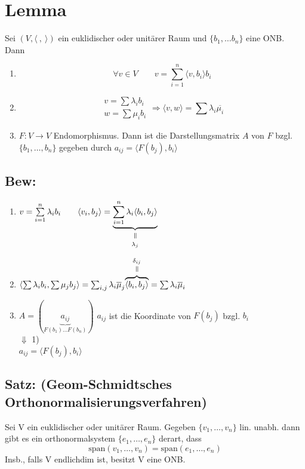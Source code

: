 \documentclass[titlepage,12pt,a4paper,ngerman]{report}
\newcommand{\verteq}{\rotatebox{90}{$\,=$}}
\newcommand{\equalto}[2]{\underset{\scriptstyle\overset{\mkern4mu\verteq}{#2}}{#1}}
\newcommand{\equaltoup}[2]{\overset{\scriptstyle\underset{\mkern4mu\verteq}{#2}}{#1}}
\newcommand{\tx}[1]{\textrm{#1}}
\newcommand{\ub}[1]{\underbrace{#1}}
\newcommand{\spa}{\tx{span}}
\newcommand{\summ}[2]{\sum_{#1}^{#2}}
\begin{document}
\section{Lemma} Sei $(V, \langle\ ,\ \rangle)$ ein euklidischer oder unitärer Raum und $\{b_1, \dots b_n \}$ eine ONB. Dann
\begin{enumerate}
	\item $$\forall v \in V \qquad v = \summ{i=1}{n} \langle v,b_i \rangle b_i$$
	\item $$\begin{array}{c} v = \sum \lambda_i b_i \\ w = \sum \mu_i b_i \end{array} \Rightarrow \langle v,w \rangle = \sum \lambda_i \overline{\mu_i}$$
	\item $ F: V \to V $ Endomorphismus. Dann ist die Darstellungsmatrix $ A $ von $ F $ bzgl. $ \{b_1, \dots , b_n\} $ gegeben durch $ a_{ij} = \langle F(b_j),b_i \rangle $
\end{enumerate}

\subsection{Bew:}
\begin{enumerate}[1)]
	\item $ v = \sum\limits_{i=1}^{n} \lambda_i b_i \qquad \langle v_i,b_j \rangle = \equalto{\ub{\sum\limits_{i=1}^{n} \lambda_i \langle b_i, b_j \rangle }}{\lambda_j} $
	\item $ \langle \sum \lambda_i b_i, \sum \mu_j b_j \rangle = \sum_{i,j} \lambda_i \overline{\mu}_j \equaltoup{\overbrace{\langle b_i,b_j \rangle}}{\delta_{ij}} = \sum \lambda_i \overline{\mu}_i $
	\item  $ A = (\ub{a_{ij}}_{F(b_1) \dots F(b_n)}) $ $ a_{ij} $ ist die Koordinate von $ F(b_j) $ bzgl. $ b_i $\\
	$ \Downarrow $ 1)\\
	$ a_{ij} = \langle F(b_j),b_i \rangle $
\end{enumerate}
\subsection{Satz: (Geom-Schmidtsches\\ Orthonormalisierungsverfahren)}
Sei V ein euklidischer oder unitärer Raum. Gegeben $ \{v_1,\dots , v_n \} $ lin. unabh. dann gibt es ein orthonormalsystem $ \{e_1,\dots , e_n \} $ derart, dass
$$\spa(v_1,\dots,v_n) = \spa(e_1,\dots,e_n)$$
Insb., falls V endlichdim ist, besitzt V eine ONB.
\end{document}
